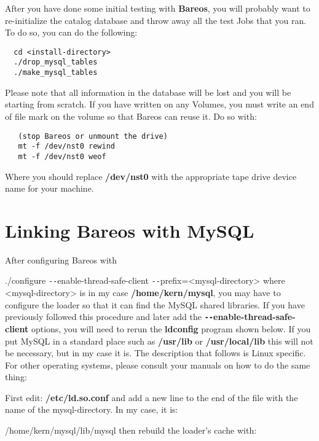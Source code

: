 After you have done some initial testing with {\bf Bareos}, you will probably
want to re-initialize the catalog database and throw away all the test Jobs
that you ran. To do so, you can do the following:

\footnotesize
\begin{verbatim}
  cd <install-directory>
  ./drop_mysql_tables
  ./make_mysql_tables
\end{verbatim}
\normalsize

Please note that all information in the database will be lost and you will be
starting from scratch. If you have written on any Volumes, you must write an
end of file mark on the volume so that Bareos can reuse it. Do so with:

\footnotesize
\begin{verbatim}
   (stop Bareos or unmount the drive)
   mt -f /dev/nst0 rewind
   mt -f /dev/nst0 weof
\end{verbatim}
\normalsize

Where you should replace {\bf /dev/nst0} with the appropriate tape drive
device name for your machine.

\section{Linking Bareos with MySQL}

After configuring Bareos with

./configure \verb:--:enable-thread-safe-client \verb:--:prefix={\textless}mysql-directory{\textgreater}
where {\textless}mysql-directory{\textgreater} is in my case {\bf /home/kern/mysql}, you may
have to configure the loader so that it can find the MySQL shared libraries.
If you have previously followed this procedure and later add the {\bf
\verb:--:enable-thread-safe-client} options, you will need to rerun the {\bf
ldconfig} program shown below. If you put MySQL in a standard place such as
{\bf /usr/lib} or {\bf /usr/local/lib} this will not be necessary, but in my
case it is. The description that follows is Linux specific. For other
operating systems, please consult your manuals on how to do the same thing:

First edit: {\bf /etc/ld.so.conf} and add a new line to the end of the file
with the name of the mysql-directory. In my case, it is:

/home/kern/mysql/lib/mysql then rebuild the loader's cache with:

